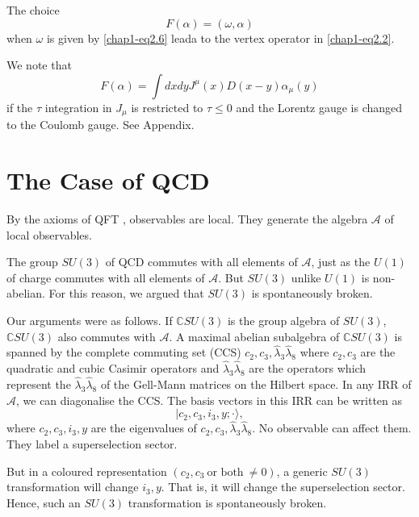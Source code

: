 The choice
\begin{equation}
F(\alpha) = (\omega, \alpha) \label{chap1-eq2.33}
\end{equation}
when $\omega$ is given by \eqref{chap1-eq2.6} leada to the vertex operator in \eqref{chap1-eq2.2}.

We note that
\begin{equation}
F(\alpha) = \int dx dy {J}^\mu (x) {D}(x-y) \alpha_\mu (y) \label{chap1-eq2.34}
\end{equation}
if the $\tau$ integration in ${J}_\mu$ is restricted to $\tau \leq 0$ and the Lorentz gauge is changed to the Coulomb gauge. See Appendix.

\section{The Case of QCD}\label{chap1-sec3}

By the axioms of QFT \cite{key9}, observables are local. They generate the algebra $\mathcal{A}$ of local observables.

The group $SU(3)$ of QCD commutes with all elements of $\mathcal{A}$, just as the $U(1)$ of charge commutes with all elements of  $\mathcal{A}$. But $SU(3)$ unlike $U(1)$ is non-abelian. For this reason, we argued \cite{key1, key4} that $SU(3)$ is spontaneously broken.

Our arguments were as follows. If $\mathbb{C}SU(3)$ is the group algebra of $SU(3)$, $\mathbb{C}SU(3)$ also commutes with $\mathcal{A}$. A maximal abelian subalgebra of $\mathbb{C}SU(3)$ is spanned by the complete commuting set (CCS) $c_2, c_3, \hat{\lambda}_3 \hat{\lambda}_8$ where $c_2, c_3$ are the quadratic and cubic Casimir operators and $\hat{\lambda}_3 \hat{\lambda}_8$ are the operators which represent the $\hat{\lambda}_3 \hat{\lambda}_8$ of the Gell-Mann matrices on the Hilbert space. In any IRR of $\mathcal{A}$, we can diagonalise the CCS. The basis vectors in this IRR can be written as
\begin{equation}
  |c_2, c_3, i_3, y;\cdot \rangle,\label{chap1-eq3.1}
\end{equation}
where $c_2, c_3, i_3, y$ are the eigenvalues of $c_2, c_3, \hat{\lambda}_3 \hat{\lambda}_8$. No observable can affect them. They label a superselection sector.

But in a coloured representation $(c_2, c_3 ~\text{or both}~\neq 0)$, a generic $SU(3)$ transformation will change $i_3, y$. That is, it will change the superselection sector. Hence, such an $SU(3)$ transformation is spontaneously broken.

